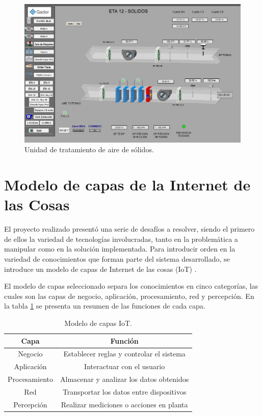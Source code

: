 \begin{figure}[h]
	\centering
	\includegraphics[width=\textwidth]{./Figures/ch2EBI2.jpg}
	\caption{Unidad de tratamiento de aire de sólidos.}
	\label{fig:ch2EBI2}
\end{figure}

\section{Modelo de capas de la Internet de las Cosas}
\label{ch1IntroduccionTecnica}

El proyecto realizado presentó una serie de desafíos a resolver, siendo el primero de ellos la variedad de tecnologías involucradas, tanto en la problemática a manipular como en la solución implementada.
Para introducir orden en la variedad de conocimientos que forman parte del sistema desarrollado, se introduce un modelo de capas de Internet de las cosas (IoT) \citep{dorsemaine2016new}.

El modelo de capas seleccionado separa los conocimientos en cinco categorías, las cuales son las capas de negocio, aplicación, procesamiento, red y percepción.
En la tabla \ref{tab:modeloCapas} se presenta un resumen de las funciones de cada capa.

\begin{table}[h]
	\centering
	\caption{\label{tab:modeloCapas}Modelo de capas IoT.}
	\begin{tabular}{c c}
		\toprule
		\textbf{Capa} & \textbf{Función}                         \\
		\midrule
		Negocio       & Establecer reglas y controlar el sistema \\
		Aplicación    & Interactuar con el usuario               \\
		Procesamiento & Almacenar y analizar los datos obtenidos \\
		Red           & Transportar los datos entre dispositivos \\
		Percepción    & Realizar mediciones o acciones en planta \\
		\bottomrule
		\hline
	\end{tabular}
\end{table}

